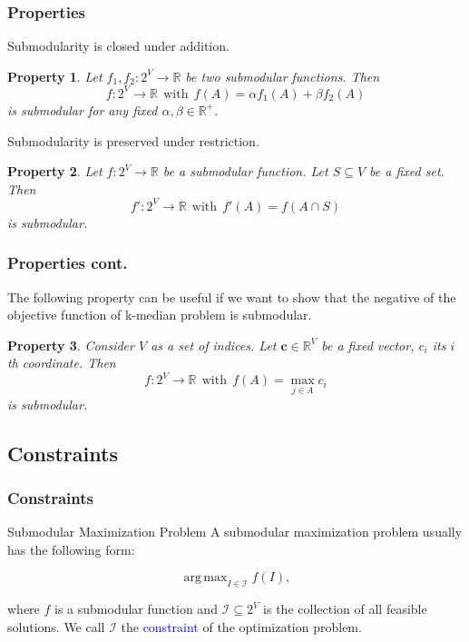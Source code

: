 \documentclass{beamer}
\newtheorem{property}{Property}
\newcommand{\calI}{\mathcal{I}}
\newcommand{\emRed}[1][]{\textcolor{blue} #1}
\newcommand{\bbR}{\mathbb{R}}
\DeclareMathOperator*{\argmax}{arg\,max}
\begin{document}
\begin{frame}
\frametitle{Properties}

Submodularity is closed under addition.
\begin{property}
  \label{prop:addition}
  Let $f_1, f_2: 2^V \rightarrow \bbR$ be two submodular functions. Then 
  $$f: 2^V\rightarrow \bbR~~\text{with}~~ f(A) = \alpha f_1(A) + \beta f_2(A)$$ 
is submodular for any fixed $\alpha, \beta \in \bbR^+$.
\end{property}
\pause
Submodularity is preserved under restriction.
\begin{property}
  \label{prop:restriction}
  Let $f: 2^V \rightarrow \bbR$ be a submodular function. Let $S\subseteq V$ be a fixed set. Then
$$f':2^V \rightarrow \bbR~~\text{with}~~f'(A) = f(A\cap S)$$
is submodular.
\end{property}
\end{frame}


\begin{frame}
\frametitle{Properties cont.}
The following property can be useful if we want to show that the negative of the objective function of k-median problem is submodular.
\begin{property}
  \label{prop:max}
Consider $V$ as a set of indices. Let $\mathbf{c}\in \bbR^V$ be a fixed vector, $c_i$ its $i$th coordinate. Then 
$$f:2^V \rightarrow \bbR~~\text{with}~~ f(A) = \max_{j\in A}c_i$$ 
is submodular.
\end{property}
\end{frame}



\subsection{Constraints}
\begin{frame}
\frametitle{Constraints}
\begin{block}{Submodular Maximization Problem}
A submodular maximization problem usually has the following form:

\begin{equation}
  \label{eq:optimization}
  \argmax_{I\in\calI} f(I),
\end{equation}
\end{block}
where $f$ is a submodular function and $\calI \subseteq 2^V$ is the collection of all feasible solutions. We call $\calI$ the \emRed{constraint} of the optimization problem.
\end{frame}
\end{document}
